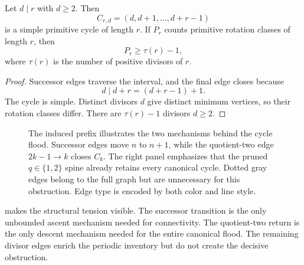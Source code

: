 \begin{proposition}
\label{prop:subflood}
Let \(d\mid r\) with \(d\ge2\).  Then
\[
 C_{r,d}=(d,d+1,\ldots,d+r-1)
\]
is a simple primitive cycle of length \(r\).  If \(P_r\) counts primitive
rotation classes of length \(r\), then
\[
 P_r\ge \tau(r)-1,
\]
where \(\tau(r)\) is the number of positive divisors of \(r\).
\end{proposition}

\begin{proof}
Successor edges traverse the interval, and the final edge closes because
\[
 d\mid d+r=(d+r-1)+1.
\]
The cycle is simple.  Distinct divisors \(d\) give distinct minimum vertices,
so their rotation classes differ.  There are \(\tau(r)-1\) divisors
\(d\ge2\).
\end{proof}

\begin{figure}[t]
\centering
\resizebox{\textwidth}{!}{}
\caption{The induced prefix illustrates the two mechanisms behind the cycle
flood.  Successor edges move \(n\) to \(n+1\), while the quotient-two edge
\(2k-1\to k\) closes \(C_k\).  The right panel emphasizes that the pruned
\(q\in\{1,2\}\) spine already retains every canonical cycle.  Dotted gray
edges belong to the full graph but are unnecessary for this obstruction.
Edge type is encoded by both color and line style.}
\label{fig:anatomy}
\end{figure}

 makes the structural tension visible.  The successor
transition is the only unbounded ascent mechanism needed for connectivity.
The quotient-two return is the only descent mechanism needed for the entire
canonical flood.  The remaining divisor edges enrich the periodic inventory
but do not create the decisive obstruction.
